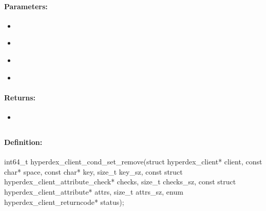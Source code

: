 \paragraph{Parameters:}
\begin{itemize}[noitemsep]
\item {}\\

\item {}\\

\item {}\\

\item {}\\

\end{itemize}

\paragraph{Returns:}
\begin{itemize}[noitemsep]
\item {}\\

\end{itemize}

\pagebreak
\subsection{}
\label{api:c:cond_set_remove}


\paragraph{Definition:}
\begin{ccode}
int64_t hyperdex_client_cond_set_remove(struct hyperdex_client* client,
        const char* space,
        const char* key, size_t key_sz,
        const struct hyperdex_client_attribute_check* checks, size_t checks_sz,
        const struct hyperdex_client_attribute* attrs, size_t attrs_sz,
        enum hyperdex_client_returncode* status);
\end{ccode}

